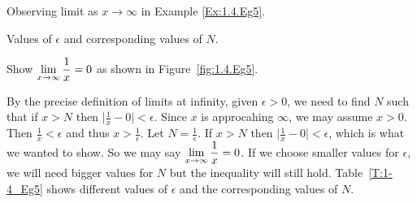 \begin{marginfigure}[-3cm]
\caption{Observing limit as $x \to \infty$ in Example \ref{Ex:1.4.Eg5}.}\label{fig:1.4.Eg5}
\end{marginfigure}

\begin{margintable} %
\begin{center}
\end{center}
\caption{Values of $\epsilon$ and corresponding values of $N$.} \label{T:1-4_Eg5}
\end{margintable}

\begin{example} \label{Ex:1.4.Eg5}
Show $\displaystyle \lim_{x \to \infty}\frac{1}{x} = 0$ as shown in Figure~\ref{fig:1.4.Eg5}.

\solution By the precise definition of limits at infinity, given $\epsilon>0$, we need to find $N$ such that if $x>N$ then $\lvert \frac{1}{x} - 0 \rvert < \epsilon$.  Since $x$ is approcahing $\infty$, we may assume $x>0$. Then $\frac{1}{x}<\epsilon$ and thus $x>\frac{1}{\epsilon}$. Let $N=\frac{1}{\epsilon}$. If $x>N$ then $\lvert \frac{1}{x} - 0 \rvert < \epsilon$, which is what we wanted to show.  So we may say $\displaystyle \lim_{x \to \infty} \frac{1}{x}=0$.
If we choose smaller values for $\epsilon$, we will need bigger values for $N$ but the inequality will still hold. Table~\ref{T:1-4_Eg5} shows different values of $\epsilon$ and the corresponding values of $N$. 


\end{example}
